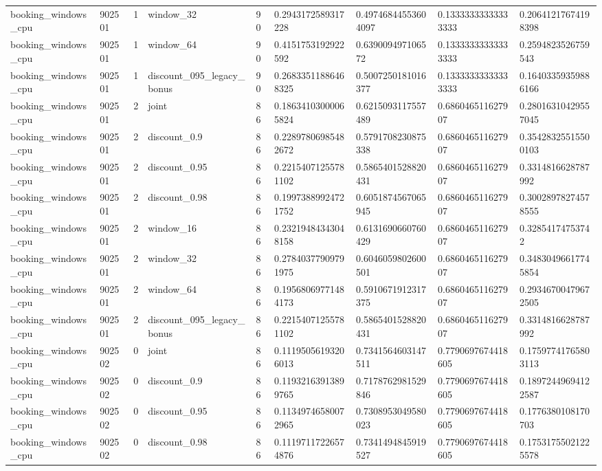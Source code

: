 \begin{tabular}{lllllllll}
booking\_windows\_cpu & 902501 & 1 & window\_32 & 90 & 0.2943172589317228 & 0.49746844553604097 & 0.13333333333333333 & 0.20641217674198398 \\
booking\_windows\_cpu & 902501 & 1 & window\_64 & 90 & 0.4151753192922592 & 0.639009497106572 & 0.13333333333333333 & 0.2594823526759543 \\
booking\_windows\_cpu & 902501 & 1 & discount\_095\_legacy\_bonus & 90 & 0.26833511886468325 & 0.5007250181016377 & 0.13333333333333333 & 0.16403359359886166 \\
booking\_windows\_cpu & 902501 & 2 & joint & 86 & 0.18634103000065824 & 0.6215093117557489 & 0.686046511627907 & 0.28016310429557045 \\
booking\_windows\_cpu & 902501 & 2 & discount\_0.9 & 86 & 0.22897806985482672 & 0.5791708230875338 & 0.686046511627907 & 0.35428325515500103 \\
booking\_windows\_cpu & 902501 & 2 & discount\_0.95 & 86 & 0.22154071255781102 & 0.5865401528820431 & 0.686046511627907 & 0.3314816628787992 \\
booking\_windows\_cpu & 902501 & 2 & discount\_0.98 & 86 & 0.19973889924721752 & 0.6051874567065945 & 0.686046511627907 & 0.30028978274578555 \\
booking\_windows\_cpu & 902501 & 2 & window\_16 & 86 & 0.23219484343048158 & 0.6131690660760429 & 0.686046511627907 & 0.32854174753742 \\
booking\_windows\_cpu & 902501 & 2 & window\_32 & 86 & 0.27840377909791975 & 0.6046059802600501 & 0.686046511627907 & 0.34830496617745854 \\
booking\_windows\_cpu & 902501 & 2 & window\_64 & 86 & 0.19568069771484173 & 0.5910671912317375 & 0.686046511627907 & 0.29346700479672505 \\
booking\_windows\_cpu & 902501 & 2 & discount\_095\_legacy\_bonus & 86 & 0.22154071255781102 & 0.5865401528820431 & 0.686046511627907 & 0.3314816628787992 \\
booking\_windows\_cpu & 902502 & 0 & joint & 86 & 0.11195056193206013 & 0.7341564603147511 & 0.7790697674418605 & 0.17597741765803113 \\
booking\_windows\_cpu & 902502 & 0 & discount\_0.9 & 86 & 0.11932163913899765 & 0.7178762981529846 & 0.7790697674418605 & 0.18972449694122587 \\
booking\_windows\_cpu & 902502 & 0 & discount\_0.95 & 86 & 0.11349746580072965 & 0.7308953049580023 & 0.7790697674418605 & 0.1776380108170703 \\
booking\_windows\_cpu & 902502 & 0 & discount\_0.98 & 86 & 0.11197117226574876 & 0.7341494845919527 & 0.7790697674418605 & 0.17531755021225578 \\

\end{tabular}
